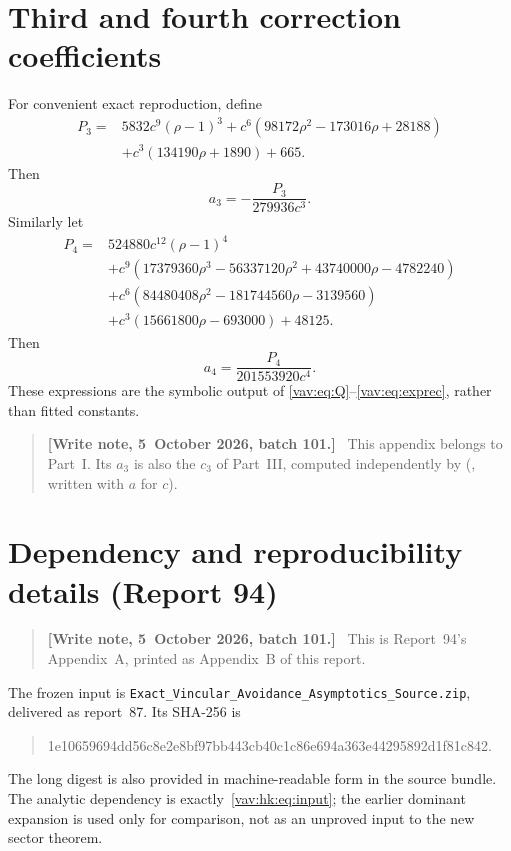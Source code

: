 \documentclass[11pt]{article}
\theoremstyle{remark}\newtheorem{remark}[theorem]{Remark}
\newenvironment{writenoteb}{\begin{quote}\small\raggedright\textbf{[Write note, 5~October 2026, batch 101.]}\ }{\end{quote}}
\begin{document}
\appendix
\section{Third and fourth correction coefficients}\label{vav:app:coeff}

For convenient exact reproduction, define
\begin{align*}
 P_3={}&5832c^9(\rho-1)^3
       +c^6(98172\rho^2-173016\rho+28188)\\
      &+c^3(134190\rho+1890)+665.
\end{align*}
Then
\begin{equation}
 a_3=-\frac{P_3}{279936c^3}.
\end{equation}
Similarly let
\begin{align*}
 P_4={}&524880c^{12}(\rho-1)^4\\
 &+c^9(17379360\rho^3-56337120\rho^2
                         +43740000\rho-4782240)\\
 &+c^6(84480408\rho^2-181744560\rho-3139560)\\
 &+c^3(15661800\rho-693000)+48125.
\end{align*}
Then
\begin{equation}
 a_4=\frac{P_4}{201553920c^4}.
\end{equation}
These expressions are the symbolic output of
\eqref{vav:eq:Q}--\eqref{vav:eq:exprec}, rather than fitted constants.
\begin{writenoteb}
This appendix belongs to Part~I. Its $a_3$ is also the $c_3$ of Part~III,
computed independently by 
(, written with $a$ for $c$).
\end{writenoteb}

\section{Dependency and reproducibility details (Report 94)}\label{vav:hk:app:dependency}
\begin{writenoteb}
This is Report~94's Appendix~A, printed as Appendix~B of this report.
\end{writenoteb}
The frozen input is \texttt{Exact\_Vincular\_Avoidance\_Asymptotics\_Source.zip}, delivered as report~87. Its SHA-256 is
\begin{quote}\ttfamily\small
1e10659694dd56c8e2e8bf97bb443cb40c1c86e694a363e44295892d1f81c842.
\end{quote}
The long digest is also provided in machine-readable form in the source bundle. The analytic dependency is exactly~\eqref{vav:hk:eq:input}; the earlier dominant expansion is used only for comparison, not as an unproved input to the new sector theorem.
\end{document}
